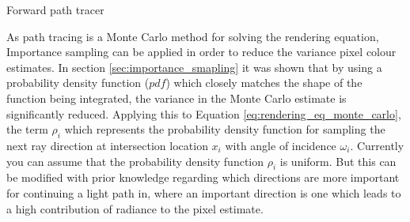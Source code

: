 \documentclass[ %
                    author={Callum Pearce},
                supervisor={Dr. Neill Campbell},
                    degree={MEng},
                     title={How effective are Temporal difference learning methods for reducing the number of zero contribution light paths, while still accurately approximating Global Illumination in Path tracing?},
                  subtitle={},
                      type={research},
                      year={2019} ]{dissertation}
\begin{document}
\begin{algorithm}[H]
\label{alg:forward_path_tracing}
\SetAlgoLined
 \caption{Forward path tracer}
\end{algorithm}

As path tracing is a Monte Carlo method for solving the rendering equation, Importance sampling can be applied in order to reduce the variance pixel colour estimates. In section \ref{sec:importance_smapling} it was shown that by using a probability density function ($pdf$) which closely matches the shape of the function being integrated, the variance in the Monte Carlo estimate is significantly reduced. Applying this to Equation \ref{eq:rendering_eq_monte_carlo}, the term $\rho_i$ which represents the probability density function for sampling the next ray direction at intersection location $x_i$ with angle of incidence $\omega_i$. Currently you can assume that the probability density function $\rho_i$ is uniform. But this can be modified with prior knowledge regarding which directions are more important for continuing a light path in, where an important direction is one which leads to a high contribution of radiance to the pixel estimate.\\
\end{document}
